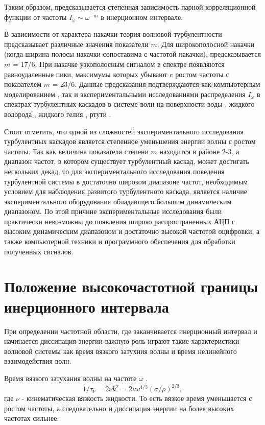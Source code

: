 Таким образом, предсказывается степенная зависимость парной корреляционной функции от частоты $I_\omega \sim \omega^{-m}$ в инерционном интервале.

В зависимости от характера накачки теория волновой турбулентности предсказывает различные значения показатели $m$. Для широкополосной накачки (когда ширина полосы накачки сопоставима с частотой накачки), предсказывается $m$ = 17/6. При накачке узкополосным сигналом в спектре появляются равноудаленные пики, максимумы которых убывают c ростом частоты с показателем $m$ = 23/6. Данные предсказания подтверждаются как компьютерным моделированием \cite{Babiano1995, Babiano1987, Falcovich1988, Pushkarev1996}, так и экспериментальными исследованиями распределения $I_\omega$
в спектрах турбулентных каскадов в системе волн на поверхности воды \cite{BrazhnikovWater}, жидкого водорода \cite{Brazhnikov2001}, жидкого гелия \cite{Abdurakhimov2007}, ртути \cite{Falcon2007}.

Стоит отметить, что одной из сложностей экспериментального исследования турбулентных каскадов является степенное уменьшения энергии волны с ростом частоты. Так как величина показателя степени $m$ находится в районе 2-3, а диапазон частот, в котором существует турбулентный каскад, может достигать нескольких декад, то для экспериментального исследования поведения турбулентной системы в достаточно широком диапазоне частот, необходимым условием для наблюдения развитого турбулентного каскада, является наличие экспериментального оборудования обладающего большим динамическим диапазоном. По этой причине экспериментальные исследования были практически невозможны до появления широко распространенных АЦП с высоким динамическим диапазоном и достаточно высокой частотой оцифровки, а также компьютерной техники и программного обеспечения для обработки полученных сигналов.

\section{Положение высокочастотной границы инерционного интервала}\label{subsect_hiFreqBound}

При определении частотной области, где заканчивается инерционный интервал и начинается диссипация энергии важную роль играют такие характеристики волновой системы как время вязкого затухния волны и время нелинейного взаимодействия волн.

Время вязкого затухания волны на частоте $\omega$ \cite[стр. 135]{land}.
\begin{equation}
\label{eq:tauNu}
1/\tau_\nu = 2\nu k^2 = 2 \nu \omega^{4/3}(\sigma/\rho)^{2/3},
\end{equation}
где $\nu$ - кинематическая вязкость жидкости.
То есть вязкое время уменьшается с ростом частоты, а следовательно и диссипация энергии на более высоких частотах сильнее.


